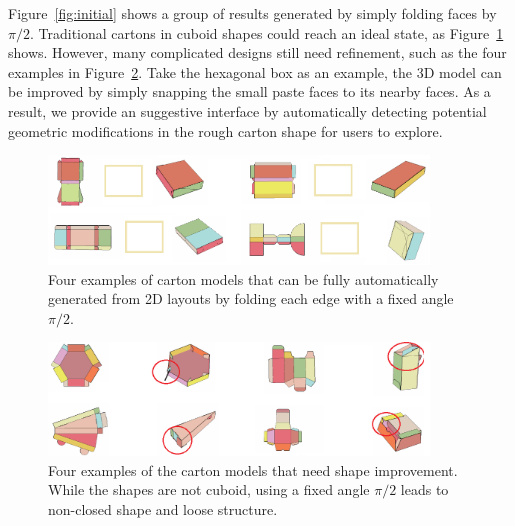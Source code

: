Figure~\ref{fig:initial} shows a group of results generated by simply folding faces by $\pi/2$.
Traditional cartons in cuboid shapes could reach an ideal state, as Figure~\ref{fig:initial-automatic} shows.
However, many complicated designs still need refinement, such as the four examples in Figure~\ref{fig:initial-need-improvement}. 
Take the hexagonal box as an example, the 3D model can be improved by simply snapping the small paste faces to its nearby faces. %
%
As a result, we provide an suggestive interface by automatically detecting potential geometric modifications in the rough carton shape for users to explore.

\begin{figure}
	\centering
	\includegraphics[width=0.9\textwidth]{images/initial-auto.png}
	\caption{Four examples of carton models that can be fully automatically generated from 2D layouts by folding each edge with a fixed angle $\pi/2$. }
	\label{fig:initial-automatic}
\end{figure}


\begin{figure}
	\centering
	\includegraphics[width=0.9\textwidth]{images/initial-improve.png}
	\caption{Four examples of the carton models that need shape improvement. While the shapes are not cuboid, using a fixed angle $\pi/2$ leads to non-closed shape and loose structure. }
	\label{fig:initial-need-improvement}
\end{figure}
